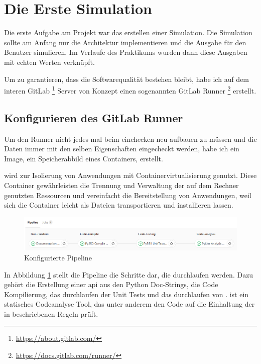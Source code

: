 \section{Die Erste Simulation}
\label{sec:first_simulation}

Die erste Aufgabe am Projekt war das erstellen einer Simulation. Die Simulation sollte am 
Anfang nur die Architektur implementieren und die Ausgabe für den Benutzer simulieren. Im 
Verlaufe des Praktikums wurden dann diese Ausgaben mit echten Werten verknüpft.

Um zu garantieren, dass die Softwarequalität bestehen bleibt, habe ich auf dem interen GitLab
\footnote{\url{https://about.gitlab.com/}} Server von Konzept einen sogenannten GitLab Runner
\footnote{\url{https://docs.gitlab.com/runner/}} erstellt. 


\subsection{Konfigurieren des GitLab Runner}
\label{subsec:gitlab_runner}

Um den Runner nicht jedes mal beim einchecken neu aufbauen zu müssen und die Daten immer mit 
den selben Eigenschaften eingecheckt werden, habe ich ein \cite{Docker} Image, ein 
Speicherabbild eines Containers, erstellt.

\cite{Docker} wird zur Isolierung von Anwendungen mit Containervirtualisierung genutzt. Diese 
Container gewährleisten die Trennung und Verwaltung der auf dem Rechner genutzten Ressourcen 
und vereinfacht die Bereitstellung von Anwendungen, weil sich die Container leicht als Dateien 
transportieren und installieren lassen.

\begin{figure}[H]
	\centering
	\includegraphics[width=1\textwidth, height=0.25\textwidth]{graphics/pipeline.png}
	\caption{Konfigurierte Pipeline}
	\label{fig:pipeline}
\end{figure}

In Abbildung \ref{fig:pipeline} stellt die Pipeline die Schritte dar, die durchlaufen werden.
Dazu gehört die Erstellung einer \ac{api} aus den Python Doc-Strings, die Code Kompilierung, 
das durchlaufen der Unit Tests und das durchlaufen von \cite{Pylint}. \cite{Pylint} ist ein 
statisches Codeanalyse Tool, das unter anderem den Code auf die Einhaltung der in \cite{PEP8} 
beschriebenen Regeln prüft.


